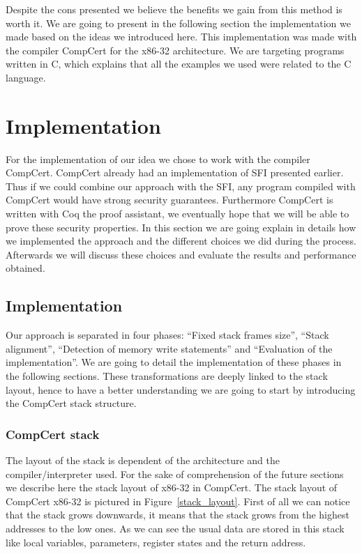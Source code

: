 \documentclass[11pt]{sdm}
\begin{document}
Despite the cons presented we believe the benefits we gain from this method is worth it.
We are going to present in the following section the implementation we made based on the ideas we introduced here. This implementation was made with the compiler CompCert for the x86-32 architecture. We are targeting programs written in C, which explains that all the examples we used were related to the C language.


\newpage
\section{Implementation}
\label{sec:implementation}

For the implementation of our idea we chose to work with the compiler CompCert. CompCert already had an implementation of SFI presented earlier. Thus if we could combine our approach with the SFI, any program compiled with CompCert would have strong security guarantees. Furthermore CompCert is written with Coq the proof assistant, we eventually hope that we will be able to prove these security properties. In this section we are going explain in details how we implemented the approach and the different choices we did during the process. Afterwards we will discuss these choices and evaluate the results and performance obtained.

\subsection{Implementation}
\label{sub:Implementation}
	Our approach is separated in four phases: ``Fixed stack frames size'', ``Stack alignment'', ``Detection of memory write statements'' and ``Evaluation of the implementation''. We are going to detail the implementation of these phases in the following sections. These transformations are deeply linked to the stack layout, hence to have a better understanding we are going to start by introducing the CompCert stack structure.

\subsubsection{CompCert stack}
\label{ssub:CompCert stack}
	The layout of the stack is dependent of the architecture and the compiler/interpreter used. For the sake of comprehension of the future sections we describe here the stack layout of x86-32 in CompCert.
The stack layout of CompCert x86-32 is pictured in Figure~\ref{stack_layout}.
First of all we can notice that the stack grows downwards, it means that the stack grows from the highest addresses to the low ones.
As we can see the usual data are stored in this stack like local variables, parameters, register states and the return address.
\end{document}
